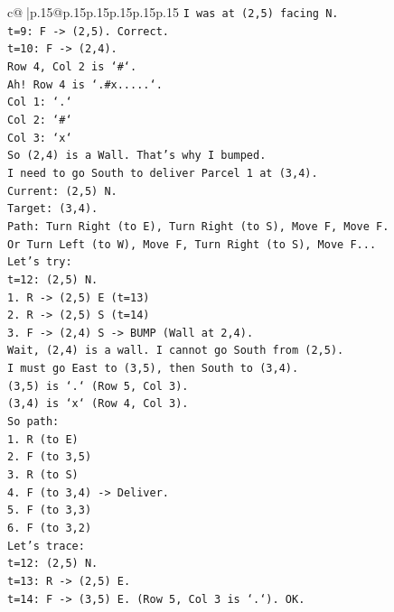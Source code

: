 \documentclass{article}
\begin{document}
{\begin{supertabular}{c@{$\;$}|p{.15\linewidth}@{}p{.15\linewidth}p{.15\linewidth}p{.15\linewidth}p{.15\linewidth}p{.15\linewidth}}
{{{\texttt{I was at (2,5) facing N.} \\
\texttt{t=9: F {-}> (2,5). Correct.} \\
\texttt{t=10: F {-}> (2,4).} \\
\texttt{Row 4, Col 2 is `\#`.} \\
\texttt{Ah! Row 4 is `.\#x.....`.} \\
\texttt{Col 1: `.`} \\
\texttt{Col 2: `\#`} \\
\texttt{Col 3: `x`} \\
\texttt{So (2,4) is a Wall. That's why I bumped.} \\
\texttt{I need to go South to deliver Parcel 1 at (3,4).} \\
\texttt{Current: (2,5) N.} \\
\texttt{Target: (3,4).} \\
\texttt{Path: Turn Right (to E), Turn Right (to S), Move F, Move F.} \\
\texttt{Or Turn Left (to W), Move F, Turn Right (to S), Move F...} \\
\texttt{Let's try:} \\
\texttt{t=12: (2,5) N.} \\
\texttt{1. R {-}> (2,5) E (t=13)} \\
\texttt{2. R {-}> (2,5) S (t=14)} \\
\texttt{3. F {-}> (2,4) S {-}> BUMP (Wall at 2,4).} \\
\texttt{Wait, (2,4) is a wall. I cannot go South from (2,5).} \\
\texttt{I must go East to (3,5), then South to (3,4).} \\
\texttt{(3,5) is `.` (Row 5, Col 3).} \\
\texttt{(3,4) is `x` (Row 4, Col 3).} \\
\texttt{So path:} \\
\texttt{1. R (to E)} \\
\texttt{2. F (to 3,5)} \\
\texttt{3. R (to S)} \\
\texttt{4. F (to 3,4) {-}> Deliver.} \\
\texttt{5. F (to 3,3)} \\
\texttt{6. F (to 3,2)} \\
\texttt{Let's trace:} \\
\texttt{t=12: (2,5) N.} \\
\texttt{t=13: R {-}> (2,5) E.} \\
\texttt{t=14: F {-}> (3,5) E. (Row 5, Col 3 is `.`). OK.} \\
}}}
\end{supertabular}}
\end{document}
